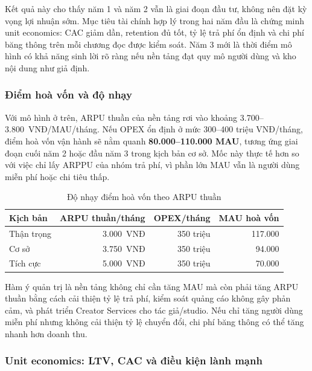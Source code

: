 Kết quả này cho thấy năm 1 và năm 2 vẫn là giai đoạn đầu tư, không nên đặt kỳ vọng lợi nhuận sớm. Mục tiêu tài chính hợp lý trong hai năm đầu là chứng minh unit economics: CAC giảm dần, retention đủ tốt, tỷ lệ trả phí ổn định và chi phí băng thông trên mỗi chương đọc được kiểm soát. Năm 3 mới là thời điểm mô hình có khả năng sinh lời rõ ràng nếu nền tảng đạt quy mô người dùng và kho nội dung như giả định.

\subsubsection{Điểm hoà vốn và độ nhạy}

Với mô hình ở trên, ARPU thuần của nền tảng rơi vào khoảng 3.700--3.800~VNĐ/\allowbreak MAU/\allowbreak tháng. Nếu OPEX ổn định ở mức 300--400 triệu VNĐ/tháng, điểm hoà vốn vận hành sẽ nằm quanh \textbf{80.000--110.000 MAU}, tương ứng giai đoạn cuối năm 2 hoặc đầu năm 3 trong kịch bản cơ sở. Mốc này thực tế hơn so với việc chỉ lấy ARPPU của nhóm trả phí, vì phần lớn MAU vẫn là người dùng miễn phí hoặc chi tiêu thấp.

\begin{table}[htbp]
\centering
\caption{Độ nhạy điểm hoà vốn theo ARPU thuần}
\label{tab:breakeven-sensitivity}
\renewcommand{\arraystretch}{1.25}
\small
\begin{tabular}{|L{4.2cm}|r|r|r|}
\hline
\textbf{Kịch bản} & \textbf{ARPU thuần/tháng} & \textbf{OPEX/tháng} & \textbf{MAU hoà vốn} \\
\hline
Thận trọng & 3.000~VNĐ & 350 triệu & 117.000 \\
\hline
Cơ sở & 3.750~VNĐ & 350 triệu & 94.000 \\
\hline
Tích cực & 5.000~VNĐ & 350 triệu & 70.000 \\
\hline
\end{tabular}
\end{table}

Hàm ý quản trị là nền tảng không chỉ cần tăng MAU mà còn phải tăng ARPU thuần bằng cách cải thiện tỷ lệ trả phí, kiểm soát quảng cáo không gây phản cảm, và phát triển Creator Services cho tác giả/studio. Nếu chỉ tăng người dùng miễn phí nhưng không cải thiện tỷ lệ chuyển đổi, chi phí băng thông có thể tăng nhanh hơn doanh thu.

\subsubsection{Unit economics: LTV, CAC và điều kiện lành mạnh}

